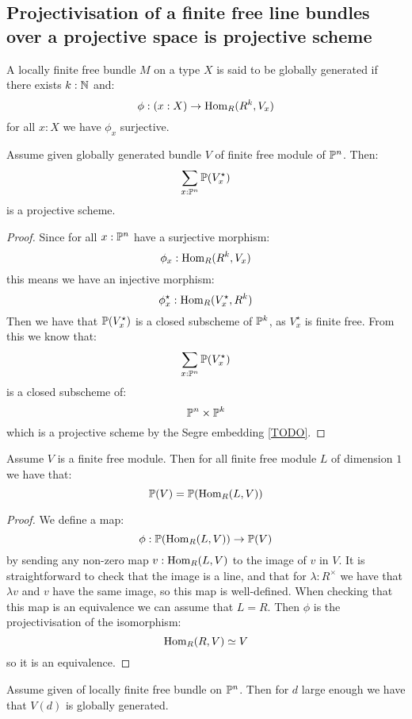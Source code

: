 \subsection{Projectivisation of a finite free line bundles over a projective space is projective scheme}

\begin{lemma}
A locally finite free bundle $M$ on a type $X$ is said to be globally generated if there exists $k:\mathbb{N}$ and:
\[\phi : (x:X) \to \mathrm{Hom}_R(R^k,V_x)\]
for all $x:X$ we have $\phi_x$ surjective.
\end{lemma}

\begin{lemma}\label{projectivisation-globally-generated-bundle-over-Pn-projective}
Assume given globally generated bundle $V$ of finite free module of $\mathbb{P}^n$. Then:
\[\sum_{x:\mathbb{P}^n}\mathbb{P}(V^\star_x)\]
is a projective scheme.
\end{lemma}

\begin{proof}
Since for all $x:\mathbb{P}^n$ have a surjective morphism:
\[\phi_x : \mathrm{Hom}_R(R^k,V_x) \]
this means we have an injective morphism:
\[\phi^\star_x :  \mathrm{Hom}_R(V_x^\star,R^k)\]
Then we have that $\mathbb{P}(V_x^\star)$ is a closed subscheme of $\mathbb{P}^k$, as $V_x^\star$ is finite free. From this we know that:
\[\sum_{x:\mathbb{P}^n}\mathbb{P}(V^\star_x)\]
is a closed subscheme of:
\[\mathbb{P}^n\times\mathbb{P}^k\]
which is a projective scheme by the Segre embedding \cref{TODO}.
\end{proof}

\begin{lemma}\label{twisting-invariant-projectivisation}
Assume $V$ is a finite free module. Then for all finite free module $L$ of dimension $1$ we have that:
\[\mathbb{P}(V) = \mathbb{P}(\mathrm{Hom}_R(L,V))\]
\end{lemma}

\begin{proof}
We define a map:
\[\phi : \mathbb{P}(\mathrm{Hom}_R(L,V)) \to \mathbb{P}(V)\]
by sending any non-zero map $v:\mathrm{Hom}_R(L,V)$ to the image of $v$ in $V$. It is straightforward to check that the image is a line, and that for $\lambda:R^\times$ we have that $\lambda v$ and $v$ have the same image, so this map is well-defined. When checking that this map is an equivalence we can assume that $L=R$. Then $\phi$ is the projectivisation of the isomorphism:
\[\mathrm{Hom}_R(R,V) \simeq V\]
so it is an equivalence.
\end{proof}

\begin{lemma}\label{twisted-enough-globally-generated}
Assume given of locally finite free bundle on $\mathbb{P}^n$. Then for $d$ large enough we have that $V(d)$ is globally generated.
\end{lemma}

